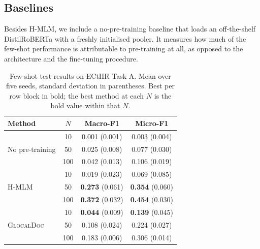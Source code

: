 \documentclass[conference]{IEEEtran}
\newcommand{\glocal}{\textsc{GlocalDoc}}
\newcommand{\hmlm}{\mbox{H-MLM}}
\begin{document}
\subsection{Baselines}
Besides \hmlm{}, we include a no-pre-training baseline that loads an off-the-shelf
DistilRoBERTa with a freshly initialised pooler. It measures how much of the
few-shot performance is attributable to pre-training at all, as opposed to the
architecture and the fine-tuning procedure.

\begin{table}[t]
\centering
\caption{Few-shot test results on ECtHR Task A. Mean over five seeds, standard
deviation in parentheses. Best per row block in bold; the best method at each $N$ is
the bold value within that $N$.}
\label{tab:main}
\begin{tabular}{l c c c}
\toprule
Method & $N$ & Macro-F1 & Micro-F1 \\
\midrule
\multirow{3}{*}{No pre-training}
 & 10  & 0.001 (0.001) & 0.003 (0.004) \\
 & 50  & 0.025 (0.008) & 0.077 (0.030) \\
 & 100 & 0.042 (0.013) & 0.106 (0.019) \\
\midrule
\multirow{3}{*}{\hmlm{}}
 & 10  & 0.019 (0.023) & 0.069 (0.085) \\
 & 50  & \textbf{0.273} (0.061) & \textbf{0.354} (0.060) \\
 & 100 & \textbf{0.372} (0.032) & \textbf{0.454} (0.030) \\
\midrule
\multirow{3}{*}{\glocal{}}
 & 10  & \textbf{0.044} (0.009) & \textbf{0.139} (0.045) \\
 & 50  & 0.108 (0.024) & 0.224 (0.027) \\
 & 100 & 0.183 (0.006) & 0.306 (0.014) \\
\bottomrule
\end{tabular}
\end{table}
\end{document}

